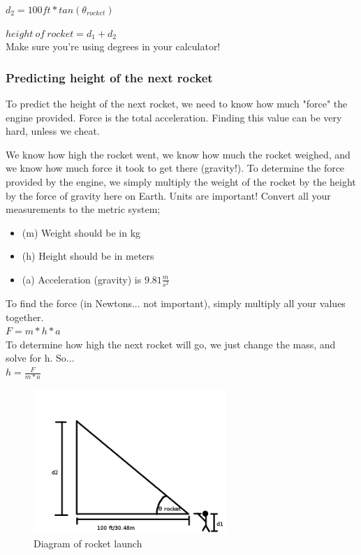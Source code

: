 \documentclass{article}
\begin{document}
$d_2=100ft*tan(\theta_{rocket})$

$height ~of ~rocket=d_1+d_2$ \\

Make sure you're using degrees in your calculator!

\subsubsection{Predicting height of the next rocket}

To predict the height of the next rocket, we need to know how much "force" the engine provided.
Force is the total acceleration.
Finding this value can be very hard, unless we cheat.

We know how high the rocket went, we know how much the rocket weighed, and we know how much force it took to get there (gravity!).
To determine the force provided by the engine, we simply multiply the weight of the rocket by the height by the force of gravity here on Earth.
Units are important!
Convert all your measurements to the metric system;
\begin{itemize}
	\item (m) Weight should be in kg
	\item (h) Height should be in meters
	\item (a) Acceleration (gravity) is $9.81 \frac{m}{s^2}$
\end{itemize}

To find the force (in Newtons... not important), simply multiply all your values together. \\

$F=m*h*a$ \\

To determine how high the next rocket will go, we just change the mass, and solve for h.
So... \\

$h=\frac{F}{m*a}$

\begin{figure}[h]
\begin{center}
\includegraphics[width=0.65\textwidth]{triangle}
\caption{Diagram of rocket launch}
\label{triangle}
\end{center}
\end{figure}
\end{document}
